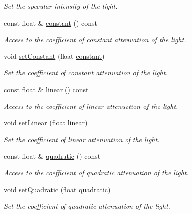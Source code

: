 \begin{DoxyCompactItemize}
\begin{DoxyCompactList}\small\item\em Set the specular intensity of the light. \end{DoxyCompactList}\item 
const float \& \hyperlink{classPointLight_afa1541cdc95ff0e7283c545e4aec2737}{constant} () const 
\begin{DoxyCompactList}\small\item\em Access to the coefficient of constant attenuation of the light. \end{DoxyCompactList}\item 
void \hyperlink{classPointLight_aa72656b486eab2403eb113a4c6a8161e}{set\+Constant} (float \hyperlink{classPointLight_afa1541cdc95ff0e7283c545e4aec2737}{constant})
\begin{DoxyCompactList}\small\item\em Set the coefficient of constant attenuation of the light. \end{DoxyCompactList}\item 
const float \& \hyperlink{classPointLight_ad79e03bc6d87477bf0d2f00866531f6c}{linear} () const 
\begin{DoxyCompactList}\small\item\em Access to the coefficient of linear attenuation of the light. \end{DoxyCompactList}\item 
void \hyperlink{classPointLight_a91369fd3b2e7717f529faf8b2ac94e57}{set\+Linear} (float \hyperlink{classPointLight_ad79e03bc6d87477bf0d2f00866531f6c}{linear})
\begin{DoxyCompactList}\small\item\em Set the coefficient of linear attenuation of the light. \end{DoxyCompactList}\item 
const float \& \hyperlink{classPointLight_ac531ddcb6a17371501f30af9474c7d8c}{quadratic} () const 
\begin{DoxyCompactList}\small\item\em Access to the coefficient of quadratic attenuation of the light. \end{DoxyCompactList}\item 
void \hyperlink{classPointLight_a0807e355fe3e00173010539f501e75b1}{set\+Quadratic} (float \hyperlink{classPointLight_ac531ddcb6a17371501f30af9474c7d8c}{quadratic})
\begin{DoxyCompactList}\small\item\em Set the coefficient of quadratic attenuation of the light. \end{DoxyCompactList}\end{DoxyCompactItemize}
